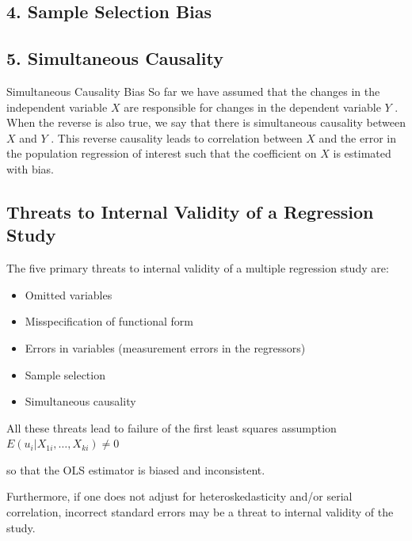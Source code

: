 \documentclass[
  letterpaper,
  DIV=11,
  numbers=noendperiod]{scrartcl}
\begin{document}
\hypertarget{sample-selection-bias}{%
\subsection{4. Sample Selection Bias}\label{sample-selection-bias}}

\hypertarget{simultaneous-causality}{%
\subsection{5. Simultaneous Causality}\label{simultaneous-causality}}

Simultaneous Causality Bias So far we have assumed that the changes in
the independent variable \(X\) are responsible for changes in the
dependent variable \(Y\) . When the reverse is also true, we say that
there is simultaneous causality between \(X\) and \(Y\) . This reverse
causality leads to correlation between \(X\) and the error in the
population regression of interest such that the coefficient on \(X\) is
estimated with bias.

\hypertarget{threats-to-internal-validity-of-a-regression-study}{%
\subsection{Threats to Internal Validity of a Regression
Study}\label{threats-to-internal-validity-of-a-regression-study}}

The five primary threats to internal validity of a multiple regression
study are:

\begin{itemize}
\item
  Omitted variables
\item
  Misspecification of functional form
\item
  Errors in variables (measurement errors in the regressors)
\item
  Sample selection
\item
  Simultaneous causality
\end{itemize}

All these threats lead to failure of the first least squares assumption
\(E(u_i\vert X_{1i},\dots ,X_{ki}) \neq 0\)

so that the OLS estimator is biased and inconsistent.

Furthermore, if one does not adjust for heteroskedasticity and/or serial
correlation, incorrect standard errors may be a threat to internal
validity of the study.
\end{document}
